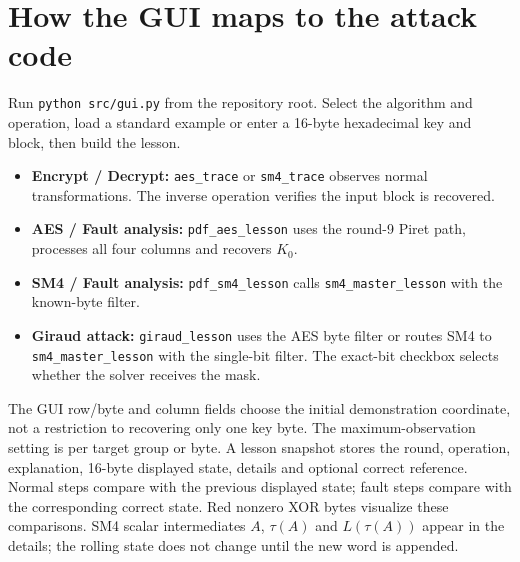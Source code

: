 \section{How the GUI maps to the attack code}
Run \texttt{python src/gui.py} from the repository root. Select the algorithm and operation, load a standard example or enter a 16-byte hexadecimal key and block, then build the lesson.
\begin{itemize}
\item \textbf{Encrypt / Decrypt:} \texttt{aes\_\allowbreak{}trace} or \texttt{sm4\_\allowbreak{}trace} observes normal transformations. The inverse operation verifies the input block is recovered.
\item \textbf{AES / Fault analysis:} \texttt{pdf\_\allowbreak{}aes\_\allowbreak{}lesson} uses the round-9 Piret path, processes all four columns and recovers $K_0$.
\item \textbf{SM4 / Fault analysis:} \texttt{pdf\_\allowbreak{}sm4\_\allowbreak{}lesson} calls \texttt{sm4\_\allowbreak{}master\_\allowbreak{}lesson} with the known-byte filter.
\item \textbf{Giraud attack:} \texttt{giraud\_\allowbreak{}lesson} uses the AES byte filter or routes SM4 to \texttt{sm4\_\allowbreak{}master\_\allowbreak{}lesson} with the single-bit filter. The exact-bit checkbox selects whether the solver receives the mask.
\end{itemize}
The GUI row/byte and column fields choose the initial demonstration coordinate, not a restriction to recovering only one key byte. The maximum-observation setting is per target group or byte. A lesson snapshot stores the round, operation, explanation, 16-byte displayed state, details and optional correct reference. Normal steps compare with the previous displayed state; fault steps compare with the corresponding correct state. Red nonzero XOR bytes visualize these comparisons. SM4 scalar intermediates $A$, $\tau(A)$ and $L(\tau(A))$ appear in the details; the rolling state does not change until the new word is appended.

